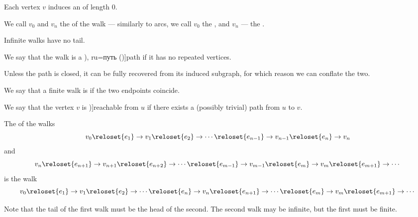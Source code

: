 \begin{definition}
\begin{thmenum}[resume=def:graph_walk]
     Each vertex \( v \) induces an  of length \( 0 \).

     We call \( v_0 \) and \( v_n \) the  of the walk --- similarly to arcs, we call \( v_0 \) the , and \( v_n \) --- the .

    Infinite walks have no tail.

     We say that the walk is a \term[bg=път (\cite[11]{Мирчев2001Графи}), ru=путь (\cite[278]{БелоусовТкачёв2004ДискретнаяМатематика})]{path} if it has no repeated vertices.

    Unless the path is closed, it can be fully recovered from its induced subgraph, for which reason we can conflate the two.

     We say that a finite walk is  if the two endpoints coincide.

     We say that the vertex \( v \) is \term[ru=достижимая (вершина) (\cite[278]{БелоусовТкачёв2004ДискретнаяМатематика})]{reachable} from \( u \) if there exists a (possibly trivial) path from \( u \) to \( v \).

     The  of the walks
    \begin{equation*}
      v_0 \reloset {e_1} \to v_1 \reloset {e_2} \to \cdots \reloset {e_{n-1}} \to v_{n-1} \reloset {e_n} \to v_n
    \end{equation*}
    and
    \begin{equation*}
      v_n \reloset {e_{n+1}} \to v_{n+1} \reloset {e_{n+2}} \to \cdots \reloset {e_{m-1}} \to v_{m-1} \reloset {e_m} \to v_m \reloset {e_{m+1}} \to \cdots
    \end{equation*}
    is the walk
    \begin{equation*}
      v_0 \reloset {e_1} \to v_1 \reloset {e_2} \to \cdots \reloset {e_n} \to v_n \reloset {e_{n+1}} \to \cdots \reloset {e_m} \to v_m  \reloset {e_{m+1}} \to \cdots
    \end{equation*}

    Note that the tail of the first walk must be the head of the second. The second walk may be infinite, but the first must be finite.
  \end{thmenum}
\end{definition}
